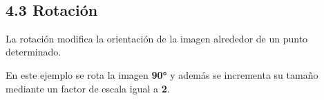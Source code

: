 \documentclass[11pt]{article}
\begin{document}
    \begin{center}
    \end{center}
    { \hspace*{\fill} \\}
    
    \subsection{4.3 Rotación}\label{rotaciuxf3n}

La rotación modifica la orientación de la imagen alrededor de un punto
determinado.

En este ejemplo se rota la imagen \textbf{90°} y además se incrementa su
tamaño mediante un factor de escala igual a \textbf{2}.
\end{document}
